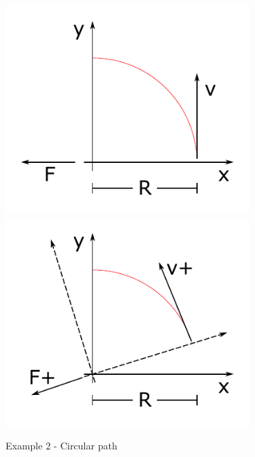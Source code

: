 \begin{minipage}{0.39\textwidth}
	\centering
	\includegraphics[width=0.7\textwidth]{02_figures/basics_cos_intuition_3}
	\label{fig:basics_cos_intuition_1}
	\vspace{5mm}
	\includegraphics[width=0.7\textwidth]{02_figures/basics_cos_intuition_4}
	\label{fig:basics_cos_intuition_2}
\end{minipage}

\clearpage


Example 2 - Circular path

